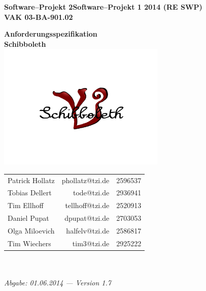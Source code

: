 \documentclass[fontsize=12pt,paper=a4,twoside]{scrartcl}
\newcommand{\swp}[0]{\ifthenelse{\boolean{langversion}}%
{Software--Projekt 2}{Software--Projekt 1}}
\newcommand{\jahr}[0]{2014 (RE SWP)}
\begin{document}
  \thispagestyle{fancy}
  \fancyhead[LO,RE]{ }
  \fancyfoot[C]{}

  \vspace{3cm}

  \begin{minipage}[H]{\textwidth}
  \begin{center}
  \bf
  \Large
  \swp{} \jahr\\
  \smallskip
  \small
  VAK 03-BA-901.02\\
  \vspace{3cm}
  \end{center}
  \end{minipage}
  \begin{minipage}[H]{\textwidth}
  \begin{center}
  \vspace{1cm}
  \bf
  {\Large Anforderungsspezifikation}\\
  \vspace{3ex}
  Schibboleth\\
  \includegraphics[width=0.6\textwidth]{Bilder/Logo.png}
  \vfill
  \end{center}
  \end{minipage}
  \vfill
  \begin{minipage}[H]{\textwidth}
  \begin{center}
  \sf
  \begin{tabular}{lrr}
  Patrick Hollatz & phollatz@tzi.de & 2596537 \\
  Tobias Dellert & tode@tzi.de & 2936941 \\
  Tim Ellhoff & tellhoff@tzi.de & 2520913\\
  Daniel Pupat & dpupat@tzi.de & 2703053 \\
  Olga Miloevich & halfelv@tzi.de  & 2586817\\  
  Tim Wiechers & tim3@tzi.de & 2925222 \\
  \end{tabular}
  \\ ~
  \vspace{2cm}
  \\
  \it Abgabe: 01.06.2014 --- Version 1.7\\ ~
  \end{center}
  \end{minipage}
\end{document}
